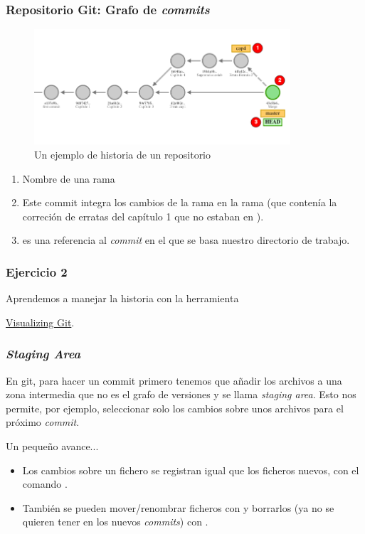\begin{frame}\frametitle{Repositorio Git: Grafo de \textit{commits}}
\hypertarget{fr:graph-example}{}
\small
\begin{figure}[h]
    \centering
    \includegraphics[width=0.85\textwidth]{images/history-example.png}
    \caption{Un ejemplo de historia de un repositorio}
\end{figure}

\begin{enumerate}
    \item Nombre de una rama
    \item Este commit integra los cambios de la rama 
    en la rama 
    (que contenía la correción de erratas del capítulo 1 que no estaban en ).
    \item {} es una referencia al \textit{commit}
    en el que se basa nuestro directorio de trabajo.
\end{enumerate}
\end{frame}

\begin{frame}\frametitle{Ejercicio 2}
\begin{center}
    \Huge
    Aprendemos a manejar la historia con la herramienta

    \href{http://git-school.github.io/visualizing-git/}{Visualizing Git}.
\end{center}
\end{frame}

\begin{frame}\frametitle{\textit{Staging Area}}
En git, para hacer un commit primero tenemos que añadir los archivos a una zona
intermedia que no es el grafo de versiones y se llama \textit{staging area}.
Esto nos permite, por ejemplo,
seleccionar solo los cambios sobre unos archivos para el próximo \textit{commit}.

\vfill
\begin{block}{Un pequeño avance...}
    \begin{itemize}
        \item Los cambios sobre un fichero se registran igual que los ficheros nuevos,
        con el comando .

        \item También se pueden mover/renombrar ficheros con
        y borrarlos (ya no se quieren tener en los nuevos \textit{commits}) con
        .
    \end{itemize}
\end{block}
\end{frame}

